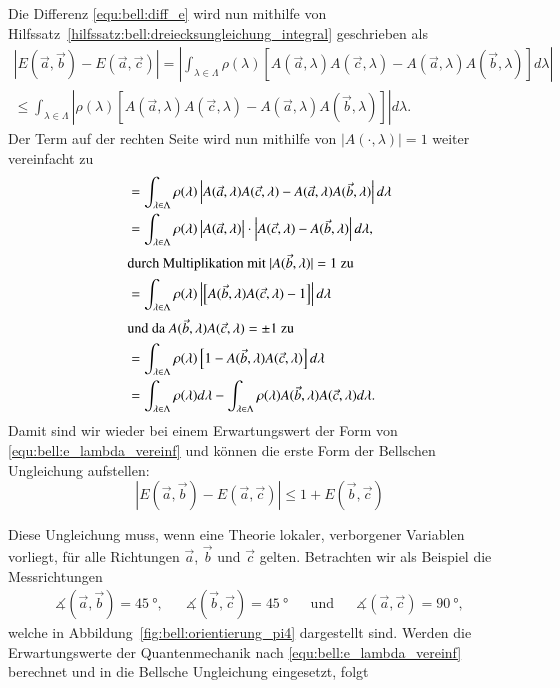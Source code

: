 \begin{refsection}
Die Differenz \eqref{equ:bell:diff_e} wird nun mithilfe von
Hilfssatz~\ref{hilfssatz:bell:dreiecksungleichung_integral} geschrieben als
\begin{equation}
\begin{split}
    |E(\vec{a},\vec{b}) - E(\vec{a},\vec{c})| =
    \left| \int_{\lambda\in\Lambda} \rho(\lambda) \left[
         A(\vec{a},\lambda)A(\vec{c},\lambda) - 
         A(\vec{a},\lambda)A(\vec{b},\lambda) \right]
        d\lambda
    \right| \\
    \leq 
    \int_{\lambda\in\Lambda} \left|  
        \rho(\lambda)\left[
         A(\vec{a},\lambda)A(\vec{c},\lambda) - 
         A(\vec{a},\lambda)A(\vec{b},\lambda)
    \right]
    \right| d\lambda.
\end{split}
\end{equation}
Der Term auf der rechten Seite wird nun mithilfe von $|A(\cdot,\lambda)|=1$
weiter vereinfacht zu
\begin{align*}
    &= \int_{\lambda\in\Lambda} \rho(\lambda) \left|
    A(\vec{a},\lambda)A(\vec{c},\lambda) - A(\vec{a},\lambda)A(\vec{b},\lambda)
    \right| d\lambda \\
    &= \int_{\lambda\in\Lambda} \rho(\lambda)
    \left| A(\vec{a},\lambda) \right| \cdot 
    \left| A(\vec{c},\lambda) - A(\vec{b},\lambda) \right| d\lambda, \\
    \intertext{durch Multiplikation mit $|A(\vec{b},\lambda)|=1$ zu}
    &= \int_{\lambda\in\Lambda} \rho(\lambda)
    \left|\left[ A(\vec{b},\lambda) A(\vec{c},\lambda) - 1 \right]\right| d\lambda \\
    \intertext{und da $A(\vec{b},\lambda)A(\vec{c},\lambda) = \pm 1$ zu}
    &= \int_{\lambda\in\Lambda} \rho(\lambda) 
    \left[1 - A(\vec{b},\lambda)A(\vec{c},\lambda) \right] d\lambda \\
    &= \int_{\lambda\in\Lambda} \rho(\lambda) d\lambda
    - \int_{\lambda\in\Lambda} \rho(\lambda) 
    A(\vec{b},\lambda)A(\vec{c},\lambda) d\lambda.
\end{align*}
Damit sind wir wieder bei einem Erwartungswert der Form von
\eqref{equ:bell:e_lambda_vereinf} und k\"onnen die erste Form der Bellschen
Ungleichung \cite[(15)]{Bell:Bell1964} aufstellen:
\begin{equation}\label{equ:bell:bellsche_ungleichung}
    \left| E(\vec{a},\vec{b}) - E(\vec{a},\vec{c}) \right| 
    \leq
    1 + E(\vec{b},\vec{c})
\end{equation}

Diese Ungleichung muss, wenn eine Theorie lokaler, verborgener Variablen 
vorliegt, f\"ur alle Richtungen $\vec{a}$, $\vec{b}$ und $\vec{c}$ gelten.
Betrachten wir als Beispiel die Messrichtungen
\begin{align*}
    \measuredangle(\vec{a},\vec{b}) = \SI{45}{\degree}, &&
    \measuredangle(\vec{b},\vec{c}) = \SI{45}{\degree} &&
    \text{und} &&
    \measuredangle(\vec{a},\vec{c}) = \SI{90}{\degree},
\end{align*}
welche in Abbildung~\ref{fig:bell:orientierung_pi4} dargestellt sind.
Werden die Erwartungswerte der Quantenmechanik nach 
\eqref{equ:bell:e_lambda_vereinf} berechnet und in die Bellsche Ungleichung
eingesetzt, folgt


\end{refsection}
